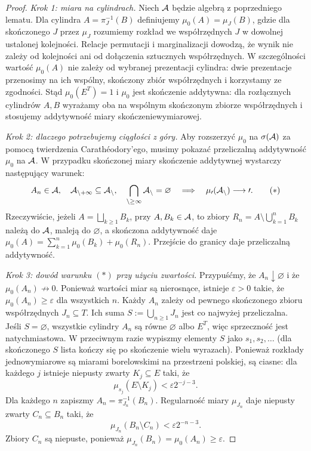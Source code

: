 \documentclass[11pt,a4paper,oneside]{report}
\numberwithin{equation}{chapter}
\theoremstyle{plain}
\theoremstyle{definition}
\theoremstyle{remark}
\begin{document}
\begin{proof}
\emph{Krok 1: miara na cylindrach.}
Niech $\cal A$ będzie algebrą z poprzedniego lematu.
Dla cylindra $A=\pi_J^{-1}(B)$ definiujemy
$\mu_0(A)=\mu_J(B)$, gdzie dla skończonego $J$
przez $\mu_J$ rozumiemy rozkład we współrzędnych $J$
w dowolnej ustalonej kolejności. Relacje permutacji i
marginalizacji dowodzą, że wynik nie zależy od kolejności
ani od dołączenia sztucznych współrzędnych. W szczególności
wartość $\mu_0(A)$ nie zależy od wybranej prezentacji
cylindra: dwie prezentacje przenosimy na ich wspólny,
skończony zbiór współrzędnych i korzystamy ze zgodności.
Stąd $\mu_0(E^T)=1$ i $\mu_0$ jest skończenie addytywna:
dla rozłącznych cylindrów $A,B$ wyrażamy oba na
wspólnym skończonym zbiorze współrzędnych i stosujemy
addytywność miary skończeniewymiarowej.

\emph{Krok 2: dlaczego potrzebujemy ciągłości z góry.}
Aby rozszerzyć $\mu_0$ na $\sigma(\cal A)$ za pomocą
twierdzenia Carathéodory'ego, musimy pokazać przeliczalną
addytywność $\mu_0$ na $\cal A$. W przypadku skończonej
miary skończenie addytywnej wystarczy następujący warunek:
\[
A_n\in\cal A,\quad A_{n+1}\subseteq A_n,\quad
\bigcap_{n\ge1}A_n=\varnothing
\quad\Longrightarrow\quad \mu_0(A_n)\longrightarrow0.
\tag{$*$}
\]
Rzeczywiście, jeżeli $A=\bigsqcup_{k\ge1}B_k$,
przy $A,B_k\in\cal A$, to zbiory
$R_n=A\setminus\bigcup_{k=1}^n B_k$ należą do $\cal A$,
maleją do $\varnothing$, a skończona addytywność daje
$\mu_0(A)=\sum_{k=1}^n\mu_0(B_k)+\mu_0(R_n)$.
Przejście do granicy daje przeliczalną addytywność.

\emph{Krok 3: dowód warunku $(*)$ przy użyciu zwartości.}
Przypuśćmy, że $A_n\downarrow\varnothing$ i że
$\mu_0(A_n)\not\to0$. Ponieważ wartości miar są
nierosnące, istnieje $\varepsilon>0$ takie, że
$\mu_0(A_n)\ge\varepsilon$ dla wszystkich $n$.
Każdy $A_n$ zależy od pewnego skończonego zbioru
współrzędnych $J_n\subseteq T$. Ich suma
$S:=\bigcup_{n\ge1}J_n$ jest co najwyżej przeliczalna.
Jeśli $S=\varnothing$, wszystkie cylindry $A_n$ są
równe $\varnothing$ albo $E^T$, więc sprzeczność jest
natychmiastowa. W przeciwnym razie wypiszmy elementy
$S$ jako $s_1,s_2,\ldots$ (dla skończonego $S$
lista kończy się po skończenie wielu wyrazach). Ponieważ rozkłady
jednowymiarowe są miarami borelowskimi na przestrzeni
polskiej, są ciasne: dla każdego $j$ istnieje niepusty
zwarty $K_j\subseteq E$ taki, że
\[
\mu_{s_j}(E\setminus K_j)<\varepsilon2^{-j-3}.
\tag{1}
\]
Dla każdego $n$ zapiszmy $A_n=\pi_{J_n}^{-1}(B_n)$.
Regularność miary $\mu_{J_n}$ daje niepusty zwarty
$C_n\subseteq B_n$ taki, że
\[
\mu_{J_n}(B_n\setminus C_n)<\varepsilon2^{-n-3}.
\tag{2}
\]
Zbiory $C_n$ są niepuste, ponieważ
$\mu_{J_n}(B_n)=\mu_0(A_n)\ge\varepsilon$.


\end{proof}
\end{document}
